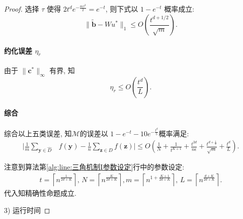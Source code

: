 \begin{proof}
选择 $\tau$ 使得 $2t^d e^{-\frac{m \tau^2}{2}} = e^{-t}$, 则下式以 $1- e^{-t}$ 概率成立:
\[
\|\tilde{\mathbf{b}} - Wu^* \|_{1} \le O \left(\frac{t^{d+1/2}}{\sqrt{m}} \right).
\]
\paragraph{约化误差 $\eta_r$} %
\label{par:约化误差_eta_r_}
由于 $\|\mathbf{c}^*\|_{\infty}$ 有界, 知
\[
\eta_r \le O \left(\frac{t^d}{L} \right).
\]
\paragraph{综合} %
\label{par:综合}
综合以上五类误差, 知$\mathcal{M}$的误差以
$1-e^{-t}-10e^{-\frac{t^d}{5}}$概率满足:
\begin{align} \label{eq:机制误差}
  \bigg|\frac{1}{m}\sum_{\mathbf{y}\in \hat{D}}&f(\mathbf{y})-
  \frac{1}{n}\sum_{\mathbf{z}\in D}f(\mathbf{z}) \bigg| \leq O \left(\frac{1}{N} + \frac{1}{t^{K+1}} + \frac{t^{2d}}{n\epsilon}
  + \frac{t^{d+\frac{1}{2}}}{\sqrt{m}} +\frac{t^d}{L}\right).
\end{align}

注意到算法第\ref{alg:line:三角机制I参数设定}行中的参数设定:
\begin{align*}
t=\left\lceil n^{\frac{1}{2d+K}} \right\rceil,\, N=\left\lceil n^\frac{K}{2d+K} \right\rceil, m=\left\lceil n^{1+\frac{K+1}{2d+K}} \right\rceil,\, L=\left\lceil n^{\frac{d+K}{2d+K}} \right\rceil.
\end{align*}
代入知精确性命题成立.

3) 运行时间


\end{proof}
